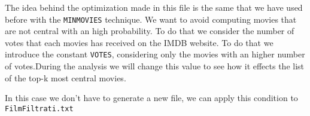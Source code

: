 \nd The idea behind the optimization made in this file is the same that we have used before with the \texttt{MINMOVIES} technique. We want to avoid computing movies that are not central with an high probability. To do that we consider the number of votes that each movies has received on the IMDB website. To do that we introduce the constant \texttt{VOTES}, considering only the movies with an higher number of votes.During the analysis we will change this value to see how it effects the list of the top-k most central movies. \s

\nd In this case we don't have to generate a new file, we can apply this condition to \texttt{FilmFiltrati.txt}
